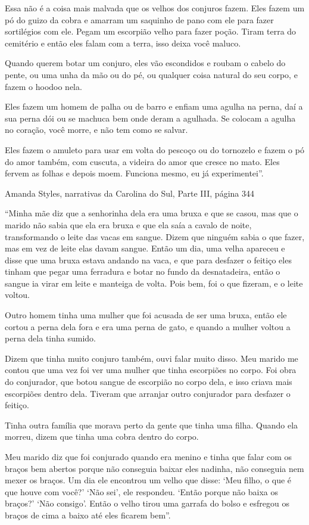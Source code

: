 Essa não é a coisa mais malvada que os velhos dos conjuros fazem. Eles
fazem um pó do guizo da cobra e amarram um saquinho de pano com ele para
fazer sortilégios com ele. Pegam um escorpião velho para fazer poção.
Tiram terra do cemitério e então eles falam com a terra, isso deixa você
maluco.

Quando querem botar um conjuro, eles vão escondidos e roubam o cabelo do
pente, ou uma unha da mão ou do pé, ou qualquer coisa natural do seu
corpo, e fazem o hoodoo nela.

Eles fazem um homem de palha ou de barro e enfiam uma agulha na perna,
daí a sua perna dói ou se machuca bem onde deram a agulhada. Se colocam
a agulha no coração, você morre, e não tem como se salvar.

Eles fazem o amuleto para usar em volta do pescoço ou do tornozelo e
fazem o pó do amor também, com cuscuta, a videira do amor que cresce no
mato. Eles fervem as folhas e depois moem. Funciona mesmo, eu já
experimentei''.

Amanda Styles, narrativas da Carolina do Sul, Parte III, página 344

``Minha mãe diz que a senhorinha dela era uma bruxa e que se casou, mas
que o marido não sabia que ela era bruxa e que ela saía a cavalo de
noite, transformando o leite das vacas em sangue. Dizem que ninguém
sabia o que fazer, mas em vez de leite elas davam sangue. Então um dia,
uma velha apareceu e disse que uma bruxa estava andando na vaca, e que
para desfazer o feitiço eles tinham que pegar uma ferradura e botar no
fundo da desnatadeira, então o sangue ia virar em leite e manteiga de
volta. Pois bem, foi o que fizeram, e o leite voltou.

Outro homem tinha uma mulher que foi acusada de ser uma bruxa, então ele
cortou a perna dela fora e era uma perna de gato, e quando a mulher
voltou a perna dela tinha sumido.

Dizem que tinha muito conjuro também, ouvi falar muito disso. Meu marido
me contou que uma vez foi ver uma mulher que tinha escorpiões no corpo.
Foi obra do conjurador, que botou sangue de escorpião no corpo dela, e
isso criava mais escorpiões dentro dela. Tiveram que arranjar outro
conjurador para desfazer o feitiço.

Tinha outra família que morava perto da gente que tinha uma filha.
Quando ela morreu, dizem que tinha uma cobra dentro do corpo.

Meu marido diz que foi conjurado quando era menino e tinha que falar com
os braços bem abertos porque não conseguia baixar eles nadinha, não
conseguia nem mexer os braços. Um dia ele encontrou um velho que disse:
`Meu filho, o que é que houve com você?' `Não sei', ele respondeu.
`Então porque não baixa os braços?' `Não consigo'. Então o velho tirou
uma garrafa do bolso e esfregou os braços de cima a baixo até eles
ficarem bem''.

